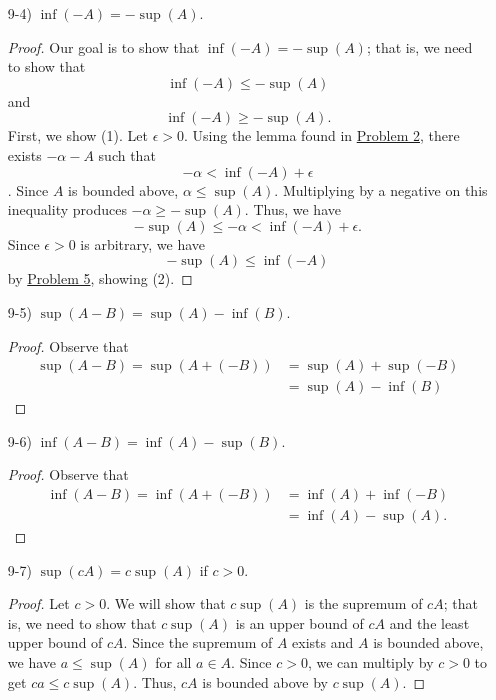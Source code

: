 \documentclass[11pt,a4paper]{article}
\begin{document}
\begin{enumerate}
\begin{enumerate}
\begin{proof}
            \end{proof}
        \item[9-4)] \( \inf(-A) = - \sup(A) \).
            \begin{proof}
            Our goal is to show that  \( \inf(-A) = - \sup(A) \); that is, we need to show that 
            \[ \inf(-A) \leq - \sup(A) \tag{1} \]
            and
            \[  \inf(-A) \geq - \sup(A). \tag{2} \]
            First, we show (1). Let \( \epsilon > 0  \).  Using the lemma found in {\hyperref[Problem 2]{Problem 2}}, there exists \( - \alpha -A  \) such that 
            \[  - \alpha < \inf(-A) + \epsilon  \].
            Since \( A  \) is bounded above, \( \alpha \leq \sup(A) \). Multiplying by a negative on this inequality produces \( - \alpha \geq - \sup(A) \). Thus, we have      
            \[ - \sup(A) \leq - \alpha < \inf(-A) + \epsilon.   \]
            Since \( \epsilon > 0  \) is arbitrary, we have
            \[  - \sup(A) \leq \inf(-A) \]
            by {\hyperref[Problem 5]{Problem 5}}, showing (2). 
            \end{proof}
        \item[9-5)] \( \sup (A -B) = \sup(A) - \inf(B) \).
            \begin{proof}
            Observe that 
            \begin{align*}
                \sup(A - B) = \sup(A + (-B)) &= \sup(A) + \sup(-B) \tag{9-2)} \\
                                             &= \sup(A) - \inf(B) \tag{9-3)}
            \end{align*}
            \end{proof}
        \item[9-6)] \( \inf(A - B) = \inf(A) - \sup(B) \).
            \begin{proof}
            Observe that
            \begin{align*}
                \inf(A -B) = \inf(A + (-B)) &= \inf(A) + \inf(-B) \tag{9-1)} \\
                                            &= \inf(A) - \sup(A). \tag{9-4)}
            \end{align*}
            \end{proof}
        \item[9-7)] \( \sup(cA) = c \sup (A)  \) if \( c > 0  \).
               \begin{proof}
               Let \( c > 0  \). We will show that \( c \sup(A) \) is the supremum of \( cA \); that is, we need to show that \(  c \sup(A)  \) is an upper bound of \( cA \) and the least upper bound of \( cA \). Since the supremum of \( A  \) exists and \( A  \) is bounded above, we have \( a \leq \sup(A)  \) for all \( a \in A  \). Since \( c > 0 \), we can multiply by \( c > 0  \) to get \( ca \leq c \sup(A) \). Thus, \( cA  \) is bounded above by \( c \sup(A)  \).  


\end{proof}
\end{enumerate}
\end{enumerate}
\end{document}
